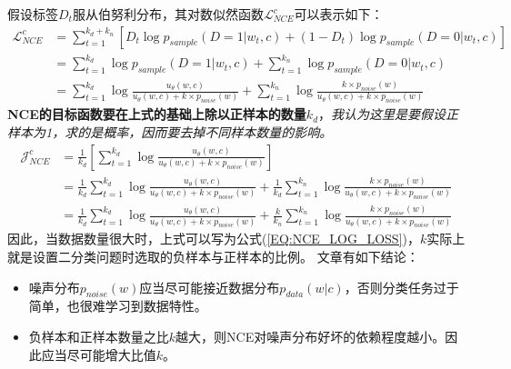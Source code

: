 \documentclass{article}
\begin{document}
假设标签$D_t$服从伯努利分布，其对数似然函数$\mathcal{L}_{NCE}^c$可以表示如下：
\begin{equation}
    \begin{split}
        \mathcal{L}_{NCE}^c &= \sum_{t=1}^{k_d + k_n} [D_t \log p_{sample}(D=1|w_t,c) + (1-D_t) \log p_{sample}(D=0|w_t,c)]\\
        &= \sum_{t=1}^{k_d} \log p_{sample}(D=1|w_t,c) + \sum_{t=1}^{k_n} \log p_{sample}(D=0|w_t,c) \\
        &= \sum_{t=1}^{k_d} \log \frac{u_\theta (w,c)}{u_\theta (w,c) + k \times p_{noise}(w)} + \sum_{t=1}^{k_n} \log \frac{k \times p_{noise}(w)}{u_\theta (w,c) + k \times p_{noise}(w)}
    \end{split}
\end{equation}
\textbf{NCE的目标函数要在上式的基础上除以正样本的数量$k_d$}，\emph{我认为这里是要假设正样本为1，求的是概率，因而要去掉不同样本数量的影响。}
\begin{equation}
    \begin{split}
        \mathcal{J}_{NCE}^{c} &= \frac{1}{k_d} [\sum_{t=1}^{k_d} \log \frac{u_\theta (w,c)}{u_\theta (w,c) + k \times p_{noise}(w)}] \\
        &= \frac{1}{k_d} \sum_{t=1}^{k_d} \log \frac{u_\theta (w,c)}{u_\theta (w,c) + k \times p_{noise}(w)} + \frac{1}{k_d} \sum_{t=1}^{k_n} \log \frac{k \times p_{noise}(w)}{u_\theta (w,c) + k \times p_{noise}(w)}\\
        &= \frac{1}{k_d} \sum_{t=1}^{k_d} \log \frac{u_\theta (w,c)}{u_\theta (w,c) + k \times p_{noise}(w)} + \frac{k}{k_n} \sum_{t=1}^{k_n} \log \frac{k \times p_{noise}(w)}{u_\theta (w,c) + k \times p_{noise}(w)}
    \end{split}
\end{equation}
因此，当数据数量很大时，上式可以写为公式(\ref{EQ:NCE_LOG_LOSS})，$k$实际上就是设置二分类问题时选取的负样本与正样本的比例。
文章\cite{DBLP:journals/jmlr/GutmannH12}有如下结论：
\begin{itemize}
    \item 噪声分布$p_{noise}(w)$应当尽可能接近数据分布$p_{data}(w|c)$，否则分类任务过于简单，也很难学习到数据特性。
    \item 负样本和正样本数量之比$k$越大，则NCE对噪声分布好坏的依赖程度越小。因此应当尽可能增大比值$k$。
\end{itemize}
\end{document}
